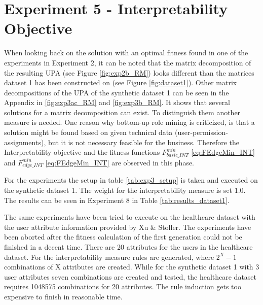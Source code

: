 \newpage
\section{Experiment 5 - Interpretability Objective}
\label{sec:exp5}
When looking back on the solution with an optimal fitness found in one of the experiments in Experiment 2, it can be noted that the matrix decomposition of the resulting UPA (see Figure \ref{fig:exp2b_RM}) looks different than the matrices dataset 1 has been constructed on (see Figure \ref{fig:dataset1}). Other matrix decompositions of the UPA of the synthetic dataset 1 can be seen in the Appendix in \ref{fig:exp3ac_RM} and \ref{fig:exp3b_RM}. It shows that several solutions for a matrix decomposition can exist. To distinguish them another measure is needed. One reason why bottom-up role mining is criticized, is that a solution might be found based on given technical data (user-permission-assignments), but it is not necessary feasible for the business. Therefore the Interpretability objective and the fitness functions
$F_{basic\_INT}^{min}$ \eqref{eq:FEdgeMin_INT} and $F_{edge\_INT}^{min}$ \eqref{eq:FEdgeMin_INT} are observed in this phase.

For the experiments the setup in table \ref{tab:exp3_setup} is taken and executed on the synthetic dataset 1. The weight for the interpretability measure is set 1.0. The results can be seen in Experiment 8 in Table \ref{tab:results_dataset1}.

The same experiments have been tried to execute on the healthcare dataset with the user attribute information provided by Xu \& Stoller\cite{Xu}. The experiments have been aborted after the fitness calculation of the first generation could not be finished in a decent time. There are 20 attributes for the users in the healthcare dataset. For the interpretability measure rules are generated, where $2^X-1$ combinations of X attributes are created. While for the synthetic dataset 1 with 3 user attributes seven combinations are created and tested, the healthcare dataset requires 1048575 combinations for 20 attributes. The rule induction gets too expensive to finish in reasonable time.